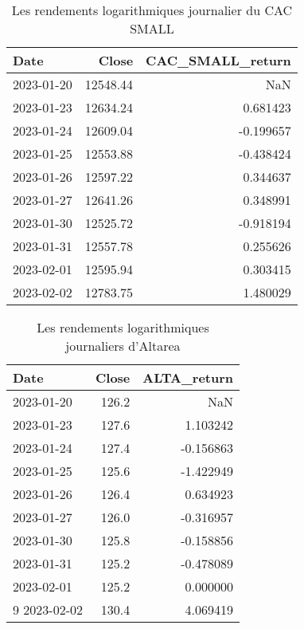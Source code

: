 \documentclass[a4paper, 12pt]{report}
\begin{document}
\begin{table}[H]
	\centering
	\begin{tabular}{@{}lrr@{}}
		\toprule
		Date       & Close    & CAC\_SMALL\_return \\ \midrule
		2023-01-20 & 12548.44 & NaN                \\
		2023-01-23 & 12634.24 & 0.681423           \\
		2023-01-24 & 12609.04 & -0.199657          \\
		2023-01-25 & 12553.88 & -0.438424          \\
		2023-01-26 & 12597.22 & 0.344637           \\
		2023-01-27 & 12641.26 & 0.348991           \\
		2023-01-30 & 12525.72 & -0.918194          \\
		2023-01-31 & 12557.78 & 0.255626           \\
		2023-02-01 & 12595.94 & 0.303415           \\
		2023-02-02 & 12783.75 & 1.480029           \\ \bottomrule
	\end{tabular}
	\caption{Les rendements logarithmiques journalier du CAC SMALL}
	\label{tab:my-table1}
\end{table}

\begin{table}[H]
	\centering
	\begin{tabular}{@{}lrr@{}}
		\toprule
		Date         & \multicolumn{1}{l}{Close} & \multicolumn{1}{l}{ALTA\_return} \\ \midrule
		2023-01-20   & 126.2                     & NaN                              \\
		2023-01-23   & 127.6                     & 1.103242                         \\
		2023-01-24   & 127.4                     & -0.156863                        \\
		2023-01-25   & 125.6                     & -1.422949                        \\
		2023-01-26   & 126.4                     & 0.634923                         \\
		2023-01-27   & 126.0                     & -0.316957                        \\
		2023-01-30   & 125.8                     & -0.158856                        \\
		2023-01-31   & 125.2                     & -0.478089                        \\
		2023-02-01   & 125.2                     & 0.000000                         \\
		9 2023-02-02 & 130.4                     & 4.069419                         \\ \bottomrule
	\end{tabular}
	\caption{Les rendements logarithmiques journaliers d'Altarea}
	\label{tab:my-table2}
\end{table}
\end{document}
